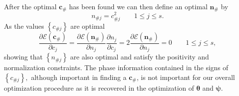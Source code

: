 \documentclass[aps,preprint]{revtex4}%
\begin{document}
After the optimal $\mathbf{c}_{\#}$ has been found we can then define an
optimal $\mathbf{n}_{\#}$ by
\begin{equation}
n_{\#j}=c_{\#j}^{2}\qquad1\leq j\leq s.
\end{equation}
As the values $\left\{  c_{\#j}\right\}  $ are optimal
\begin{equation}
\frac{\partial\mathbf{\mathcal{E}\left(  \mathbf{c}_{\#}\right)  }}{\partial
c_{j}}=\frac{\partial\mathbf{\mathcal{E}\left(  \mathbf{n}_{\#}\right)  }%
}{\partial n_{j}}\frac{\partial n_{j}}{\partial c_{j}}=2\frac{\partial
\mathbf{\mathcal{E}\left(  \mathbf{n}_{\#}\right)  }}{\partial n_{j}}%
=0\qquad1\leq j\leq s,
\end{equation}
showing that $\left\{  n_{\#j}\right\}  $ are also optimal and satisfy the
positivity and normalization constraints. The phase information contained in
the signs of $\left\{  c_{\#j}\right\}  ,$ although important in finding a
$\mathbf{c}_{\#}$, is not important for our overall optimization procedure as
it is recovered in the optimization of $\mathbf{\theta}$ and $\mathbf{\psi}$.
\end{document}
